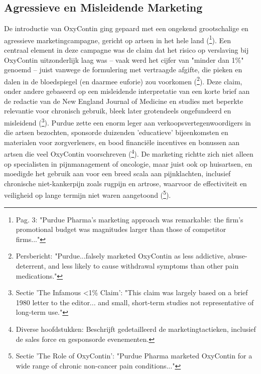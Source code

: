 \documentclass[11pt, a4paper]{report} %
\begin{document}
\subsection{Agressieve en Misleidende Marketing}
De introductie van OxyContin ging gepaard met een ongekend grootschalige en agressieve marketingcampagne, gericht op artsen in het hele land (\cite{Maclean2020EconomicStudiesOpioid}\footnote{Pag. 3: "Purdue Pharma’s marketing approach was remarkable: the firm’s promotional budget was magnitudes larger than those of competitor firms..."}). Een centraal element in deze campagne was de claim dat het risico op verslaving bij OxyContin uitzonderlijk laag was – vaak werd het cijfer van "minder dan 1\%" genoemd – juist vanwege de formulering met vertraagde afgifte, die pieken en dalen in de bloedspiegel (en daarmee euforie) zou voorkomen (\cite{JusticeDeptPurdueResolution}\footnote{Persbericht: "Purdue...falsely marketed OxyContin as less addictive, abuse-deterrent, and less likely to cause withdrawal symptoms than other pain medications."}). Deze claim, onder andere gebaseerd op een misleidende interpretatie van een korte brief aan de redactie van de New England Journal of Medicine en studies met beperkte relevantie voor chronisch gebruik, bleek later grotendeels ongefundeerd en misleidend (\cite{HealthlineDopesickTruth}\footnote{Sectie 'The Infamous <1\% Claim': "This claim was largely based on a brief 1980 letter to the editor... and small, short-term studies not representative of long-term use."}). Purdue zette een enorm leger aan verkoopsvertegenwoordigers in die artsen bezochten, sponsorde duizenden 'educatieve' bijeenkomsten en materialen voor zorgverleners, en bood financiële incentives en bonussen aan artsen die veel OxyContin voorschreven (\cite{Macy2018Dopesick}\footnote{Diverse hoofdstukken: Beschrijft gedetailleerd de marketingtactieken, inclusief de sales force en gesponsorde evenementen.}). De marketing richtte zich niet alleen op specialisten in pijnmanagement of oncologie, maar juist ook op huisartsen, en moedigde het gebruik aan voor een breed scala aan pijnklachten, inclusief chronische niet-kankerpijn zoals rugpijn en artrose, waarvoor de effectiviteit en veiligheid op lange termijn niet waren aangetoond (\cite{CRS2022OpioidCrisisHistory}\footnote{Sectie 'The Role of OxyContin': "Purdue Pharma marketed OxyContin for a wide range of chronic non-cancer pain conditions..."}).
\end{document}

